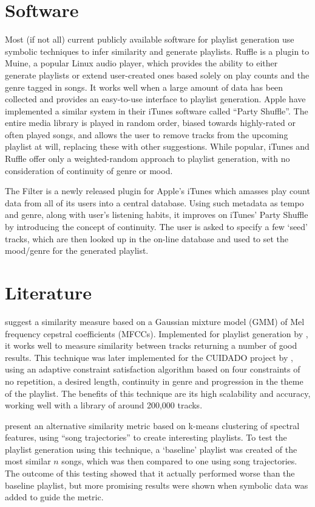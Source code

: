 \section{Software}
Most (if not all) current publicly available software for playlist generation use symbolic techniques to infer similarity and generate playlists. Ruffle is a plugin to Muine, a popular Linux audio player, which provides the ability to either generate playlists or extend user-created ones based solely on play counts and the genre tagged in songs. It works well when a large amount of data has been collected and provides an easy-to-use interface to playlist generation. Apple have implemented a similar system in their iTunes software called ``Party Shuffle''. The entire media library is played in random order, biased towards highly-rated or often played songs, and allows the user to remove tracks from the upcoming playlist at will, replacing these with other suggestions. While popular, iTunes and Ruffle offer only a weighted-random approach to playlist generation, with no consideration of continuity of genre or mood.

The Filter is a newly released plugin for Apple's iTunes which amasses play count data from all of its users into a central database. Using such metadata as tempo and genre, along with user's listening habits, it improves on iTunes' Party Shuffle by introducing the concept of continuity. The user is asked to specify a few `seed' tracks, which are then looked up in the on-line database and used to set the mood/genre for the generated playlist.
\section{Literature}
\citet*{Aucouturier2002a} suggest a similarity measure based on a Gaussian mixture model (GMM) of Mel frequency cepstral coefficients (MFCCs). Implemented for playlist generation by \citet{Schnitzer2003}, it works well to measure similarity between tracks returning a number of good results. This technique was later implemented for the CUIDADO project by \citet*{Aucouturier2003}, using an adaptive constraint satisfaction algorithm based on four constraints of no repetition, a desired length, continuity in genre and progression in the theme of the playlist. The benefits of this technique are its high scalability and accuracy, working well with a library of around 200,000 tracks.

\citet{Logan2001} present an alternative similarity metric based on k-means clustering of spectral features, using ``song trajectories'' to create interesting playlists. To test the playlist generation using this technique, a `baseline' playlist was created of the most similar $n$ songs, which was then compared to one using song trajectories. The outcome of this testing showed that it actually performed worse than the baseline playlist, but more promising results were shown when symbolic data was added to guide the metric.

